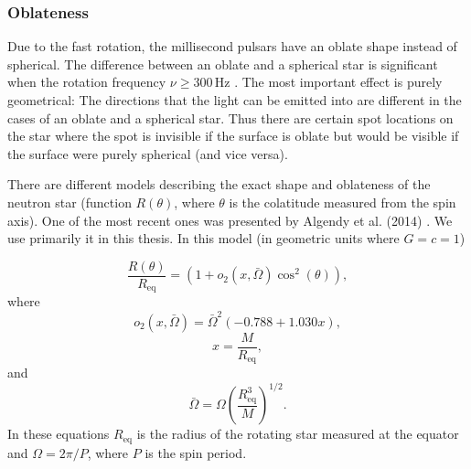\documentclass{wihuri}
\begin{document}
\subsubsection{Oblateness}

Due to the fast rotation, the millisecond pulsars have an oblate shape instead of spherical. The difference between an oblate and a spherical star is significant when the rotation frequency $\nu \ge 300 \, \mathrm{Hz}$ \cite{cadeau}%
. The most important effect is purely geometrical: The directions that the light can be emitted into are different in the cases of an oblate and a spherical star. Thus there are certain spot locations on the star where the spot is invisible if the surface is oblate but would be visible if the surface were purely spherical (and vice versa).


There are different models describing the exact shape and oblateness of the neutron star (function $R(\theta)$, where $\theta$ is the colatitude measured from the spin axis).
One of the most recent ones was presented by Algendy et al. (2014) \cite{algendy}. 
We use primarily it in this thesis. In this model (in geometric units
where $G = c = 1$)

\begin{equation}
\label{rtheta2}
\frac{R(\theta)}{R_{\mathrm{eq}}} = (1 + o_{2}(x,\bar{\Omega})\cos^{2}(\theta)),
\end{equation}
where
\begin{equation}
\label{otwo}
o_{2}(x,\bar{\Omega}) = \bar{\Omega}^{2}(-0.788+1.030x),
\end{equation}
\begin{equation}
\label{rtheta2x}
x = \frac{M}{R_{\mathrm{eq}}},
\end{equation}
and
\begin{equation}
\label{rtheta2omega}
\bar{\Omega} = \Omega \left(\frac{R_{\mathrm{eq}}^{3}}{M} \right)^{1/2}.
\end{equation}
In these equations $R_{\mathrm{eq}}$ is the radius of the rotating star measured at the equator and $\Omega = 2\pi/P$, where $P$ is the spin period. %
\end{document}
